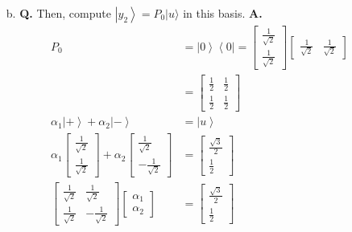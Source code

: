 \documentclass[main.tex]{subfiles}
\begin{document}
\begin{enumerate}
\begin{enumerate}
        \item[b.] \textbf{Q.} Then, compute $\left|y_{2}\right\rangle=P_{0}|u\rangle$ in this basis. \textbf{A.}
        \begin{align*}
            P_{0}                                                               & = \left|0\right\rangle \left\langle 0\right| 
                                                                                        = \left[\begin{array}{l} \frac{1}{\sqrt{2}} \\ \frac{1}{\sqrt{2}} \end{array}\right] 
                                                                                        \left[\begin{array}{ll} \frac{1}{\sqrt{2}} & \frac{1}{\sqrt{2}} \end{array}\right]\\
                                                                                & = \left[\begin{array}{ll} \frac{1}{2} & \frac{1}{2} \\ \frac{1}{2} & \frac{1}{2} \end{array}\right] \\
            \alpha_{1}\left|+\right\rangle+\alpha_{2}\left|-\right\rangle       & = \left|u\right\rangle\\
            \alpha_{1} \left[\begin{array}{l} \frac{1}{\sqrt{2}} 
            \\ \frac{1}{\sqrt{2}} \end{array}\right]
            + \alpha_{2} \left[\begin{array}{l} \frac{1}{\sqrt{2}} 
            \\ -\frac{1}{\sqrt{2}} \end{array}\right]                                   & = \left[\begin{array}{c} \frac{\sqrt{3}}{2} \\ \frac{1}{2} \end{array}\right] \\
            \left[\begin{array}{ll} \frac{1}{\sqrt{2}} & \frac{1}{\sqrt{2}} 
            \\ \frac{1}{\sqrt{2}} & -\frac{1}{\sqrt{2}} \end{array}\right]
            \left[\begin{array}{c} \alpha_{1} \\ \alpha_{2} \end{array}\right]          & = \left[\begin{array}{c} \frac{\sqrt{3}}{2} \\ \frac{1}{2} \end{array}\right] \tag{matrix is unitary, inverse is the adjoint} \\

\end{align*}
\end{enumerate}
\end{enumerate}
\end{document}
